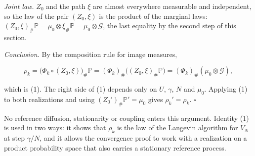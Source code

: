 \documentclass[11pt,a4paper]{article}
\begin{document}
\emph{Joint law.} \(Z_0\) and the path \(\xi\) are almost everywhere measurable and independent, so the law of the pair \((Z_0,\xi)\) is the product of the marginal laws: \((Z_0,\xi)_\#\mathbb P=\mu_0\otimes\xi_\#\mathbb P=\mu_0\otimes\mathcal G\), the last equality by the second step of this section.




\emph{Conclusion.} By the composition rule for image measures,


\[\rho_k=\bigl(\Phi_k\circ(Z_0,\xi)\bigr)_\#\mathbb P=(\Phi_k)_\#\bigl((Z_0,\xi)_\#\mathbb P\bigr)=(\Phi_k)_\#(\mu_0\otimes\mathcal G),\]


which is (1). The right side of (1) depends only on \(U\), \(\gamma\), \(N\) and \(\mu_0\). Applying (1) to both realizations and using \((Z_0')_\#\mathbb P'=\mu_0\) gives \(\rho_k'=\rho_k\). \(\square\)




No reference diffusion, stationarity or coupling enters this argument. Identity (1) is used in two ways: it shows that \(\rho_k\) is the law of the Langevin algorithm for \(V_N\) at step \(\gamma/N\), and it allows the convergence proof to work with a realization on a product probability space that also carries a stationary reference process.
\end{document}
